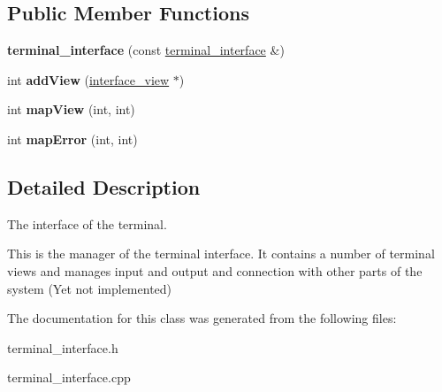 \subsection*{Public Member Functions}
\begin{CompactItemize}
\item 
\hypertarget{classterminal__interface_63c3bbb2e695d3ebe8a772f57266f713}{
\textbf{terminal\_\-interface} (const \hyperlink{classterminal__interface}{terminal\_\-interface} \&)}
\label{classterminal__interface_63c3bbb2e695d3ebe8a772f57266f713}

\item 
\hypertarget{classterminal__interface_4ca4a68b333ea8de4c81de895e6a1d24}{
int \textbf{addView} (\hyperlink{classinterface__view}{interface\_\-view} $\ast$)}
\label{classterminal__interface_4ca4a68b333ea8de4c81de895e6a1d24}

\item 
\hypertarget{classterminal__interface_f5fcbd865b9d76b579ba7f047e4e7dc3}{
int \textbf{mapView} (int, int)}
\label{classterminal__interface_f5fcbd865b9d76b579ba7f047e4e7dc3}

\item 
\hypertarget{classterminal__interface_8b97bf1a6947ba8c24b93de3d501b4fb}{
int \textbf{mapError} (int, int)}
\label{classterminal__interface_8b97bf1a6947ba8c24b93de3d501b4fb}

\end{CompactItemize}


\subsection{Detailed Description}
The interface of the terminal. 

This is the manager of the terminal interface. It contains a number of terminal views and manages input and output and connection with other parts of the system (Yet not implemented) 

The documentation for this class was generated from the following files:\begin{CompactItemize}
\item 
terminal\_\-interface.h\item 
terminal\_\-interface.cpp\end{CompactItemize}
